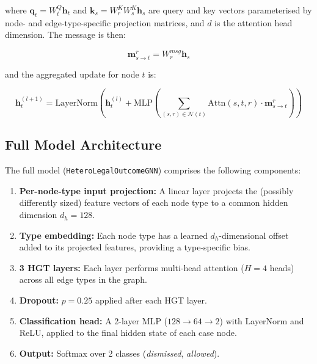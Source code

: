 \documentclass[12pt,a4paper]{report}
\begin{document}
where $\mathbf{q}_t = W_t^Q \mathbf{h}_t$ and $\mathbf{k}_s = W_r^K W_s^K \mathbf{h}_s$ are query and key vectors parameterised by node- and edge-type-specific projection matrices, and $d$ is the attention head dimension. The message is then:

\begin{equation}
  \mathbf{m}_{s \to t}^r = W_r^{msg} \mathbf{h}_s
\end{equation}

and the aggregated update for node $t$ is:

\begin{equation}
  \mathbf{h}_t^{(l+1)} = \text{LayerNorm}\left(\mathbf{h}_t^{(l)} + \text{MLP}\left(\sum_{(s,r) \in \mathcal{N}(t)} \text{Attn}(s,t,r) \cdot \mathbf{m}_{s \to t}^r\right)\right)
\end{equation}

\subsection{Full Model Architecture}

The full model (\texttt{HeteroLegalOutcomeGNN}) comprises the following components:

\begin{enumerate}
  \item \textbf{Per-node-type input projection:} A linear layer projects the (possibly differently sized) feature vectors of each node type to a common hidden dimension $d_h = 128$.
  \item \textbf{Type embedding:} Each node type has a learned $d_h$-dimensional offset added to its projected features, providing a type-specific bias.
  \item \textbf{3 HGT layers:} Each layer performs multi-head attention ($H=4$ heads) across all edge types in the graph.
  \item \textbf{Dropout:} $p = 0.25$ applied after each HGT layer.
  \item \textbf{Classification head:} A 2-layer MLP ($128 \to 64 \to 2$) with LayerNorm and ReLU, applied to the final hidden state of each case node.
  \item \textbf{Output:} Softmax over 2 classes (\textit{dismissed}, \textit{allowed}).
\end{enumerate}
\end{document}
